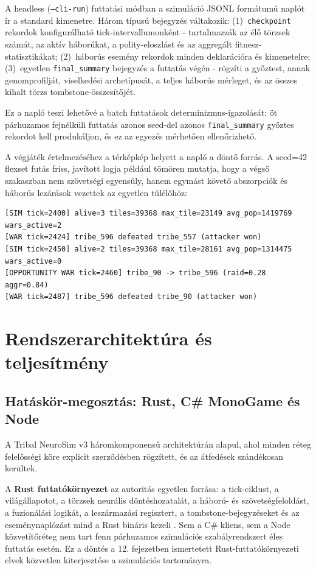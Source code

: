 ﻿\documentclass[a4paper,12pt]{report}
\begin{document}
A headless (\texttt{--cli-run}) futtatási módban a szimuláció JSONL formátumú naplót ír
a standard kimenetre. Három típusú bejegyzés váltakozik:
(1)~\texttt{checkpoint} rekordok konfigurálható tick-intervallumonként - tartalmazzák
az élő törzsek számát, az aktív háborúkat, a polity-eloszlást és az aggregált
fitnesz-statisztikákat;
(2)~háborús esemény rekordok minden deklarációra és kimenetelre;
(3)~egyetlen \texttt{final\_summary} bejegyzés a futtatás végén - rögzíti a győztest,
annak genomprofilját, viselkedési archetípusát, a teljes háborús mérleget, és
az összes kihalt törzs tombstone-összesítőjét.

Ez a napló teszi lehetővé a batch futtatások determinizmus-igazolását: öt párhuzamos
fejnélküli futtatás azonos seed-del azonos \texttt{final\_summary} győztes rekordot kell
produkáljon, és ez az egyezés mérhetően ellenőrizhető.

A végjáték értelmezéséhez a térképkép helyett a napló a döntő forrás. A seed=42
flexset futás friss, javított logja például tömören mutatja, hogy a végső szakaszban
nem szövetségi egyensúly, hanem egymást követő abszorpciók és háborús lezárások vezettek
az egyetlen túlélőhöz:

\begin{lstlisting}[language={},caption={Flexset seed=42 végjáték-részlet a javított futás logjából}]
[SIM tick=2400] alive=3 tiles=39368 max_tile=23149 avg_pop=1419769 wars_active=2
[WAR tick=2424] tribe_596 defeated tribe_557 (attacker won)
[SIM tick=2450] alive=2 tiles=39368 max_tile=28161 avg_pop=1314475 wars_active=0
[OPPORTUNITY WAR tick=2460] tribe_90 -> tribe_596 (raid=0.28 aggr=0.84)
[WAR tick=2487] tribe_596 defeated tribe_90 (attacker won)
\end{lstlisting}

\section{Rendszerarchitektúra és teljesítmény}
\label{sec:neurosim-24-architecture}

\subsection*{Hatáskör-megosztás: Rust, C\# MonoGame és Node}

A Tribal NeuroSim v3 háromkomponensű architektúrán alapul, ahol minden réteg
felelősségi köre explicit szerződésben rögzített, és az átfedések szándékosan kerültek.

A \textbf{Rust futtatókörnyezet} az autoritás egyetlen forrása: a tick-ciklust,
a világállapotot, a törzsek neurális döntéshozatalát, a háború- és szövetségfeloldást,
a fuzionálási logikát, a leszármazási regisztert, a tombstone-bejegyzéseket
és az eseménynaplózást mind a Rust bináris kezeli \cite{jung2020}.
Sem a C\# kliens, sem a Node közvetítőréteg nem tart fenn párhuzamos
szimulációs szabályrendszert éles futtatás esetén.
Ez a döntés a 12. fejezetben ismertetett Rust-futtatókörnyezeti elvek közvetlen
kiterjesztése a szimulációs tartományra.
\end{document}
